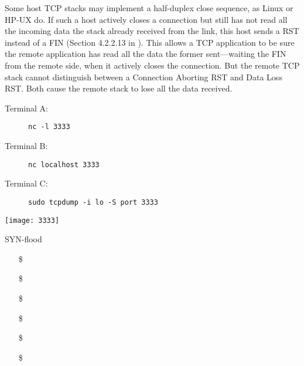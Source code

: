 Some host TCP stacks may implement a half-duplex close sequence, as Linux or HP-UX do. If
such a host actively closes a connection but still has not read all the incoming data the
stack already received from the link, this host sends a RST instead of a FIN (Section
4.2.2.13 in ). This allows a TCP application to be sure the
remote application has read all the data the former sent—waiting the FIN from the remote
side, when it actively closes the connection. But the remote TCP stack cannot distinguish
between a Connection Aborting RST and Data Loss RST. Both cause the remote stack to lose
all the data received.

\begin{frame}%
  \begin{minipage}{.78\linewidth}
    \begin{description}
    \item[Terminal A:] \texttt{nc -l 3333}
    \item[Terminal B:] \texttt{nc localhost 3333}
    \item[Terminal C:] \texttt{sudo tcpdump -i lo -S port 3333}
    \end{description}
  \end{minipage}\hfill
  \begin{minipage}{.2\linewidth}
    \texttt{[image: 3333]}
  \end{minipage}
  \begin{center}
  \end{center}
\end{frame}

\begin{frame}{SYN-flood}
  \begin{itemize}
  \item[\$] 
  \item[\$] 
  \item[\$] 
  \item[\$] 
  \item[\$] 
  \item[\$] 
  \end{itemize}
\end{frame}

